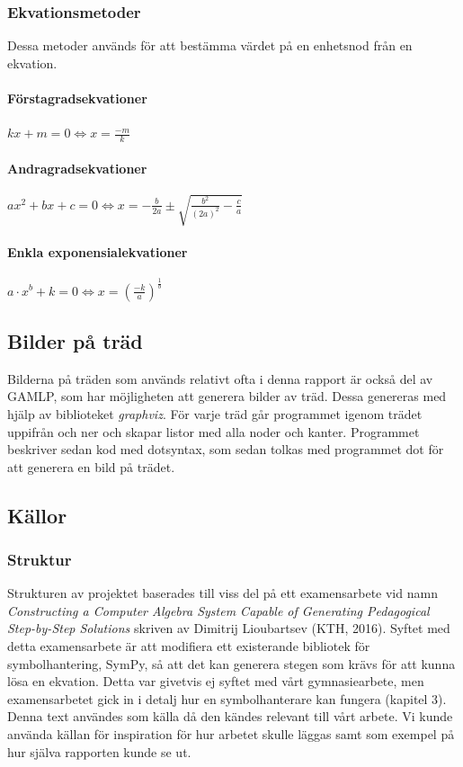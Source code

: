\documentclass[12pt,a4paper]{article}
\begin{document}
\subsubsection{Ekvationsmetoder}
Dessa metoder används för att bestämma värdet på en enhetsnod från en ekvation.
\label{subsubsec:Ekvationsmetoder}
\paragraph{Förstagradsekvationer}
\(kx+m=0\Leftrightarrow x=\frac{-m}{k}\)
\paragraph{Andragradsekvationer}
\(ax^{2}+bx+c=0\Leftrightarrow x=-\frac{b}{2a}\pm \sqrt{\frac{b^{2}}{(2a)^{2}}-\frac{c}{a}}\)
\paragraph{Enkla exponensialekvationer}
\(a\cdot x^{b}+k=0\Leftrightarrow x=(\frac{-k}{a})^{\frac{1}{b}}\)

\subsection{Bilder på träd}
Bilderna på träden som används relativt ofta i denna rapport är också del av GAMLP, som har möjligheten att generera bilder av träd. Dessa genereras med hjälp av biblioteket \textit{graphviz}. För varje träd går programmet igenom trädet uppifrån och ner och skapar listor med alla noder och kanter. Programmet beskriver sedan kod med dotsyntax, som sedan tolkas med programmet dot för att generera en bild på trädet.

\subsection{Källor}
\subsubsection{Struktur}
Strukturen av projektet baserades till viss del på ett examensarbete vid namn \textit{Constructing a Computer Algebra System Capable of Generating Pedagogical Step-by-Step Solutions} skriven av Dimitrij Lioubartsev (KTH, 2016). Syftet med detta examensarbete är att modifiera ett existerande bibliotek för symbolhantering, SymPy, så att det kan generera stegen som krävs för att kunna lösa en ekvation. Detta var givetvis ej syftet med vårt gymnasiearbete, men examensarbetet gick in i detalj hur en symbolhanterare kan fungera (kapitel 3). Denna text användes som källa då den kändes relevant till vårt arbete. Vi kunde använda källan för inspiration för hur arbetet skulle läggas samt som exempel på hur själva rapporten kunde se ut.
\end{document}
